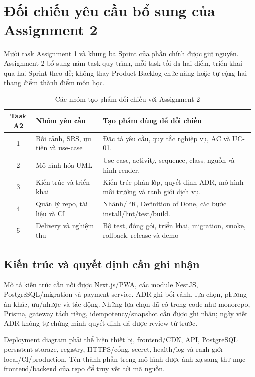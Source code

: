 \section{Đối chiếu yêu cầu bổ sung của Assignment 2}
Mười task Assignment 1 và khung ba Sprint của phần chính được giữ nguyên. Assignment 2 bổ sung năm task quy trình, mỗi task tối đa hai điểm, triển khai qua hai Sprint theo đề; không thay Product Backlog chức năng hoặc tự cộng hai thang điểm thành điểm môn học.

\begin{table}[htbp]\centering\small
\begin{tabularx}{\textwidth}{|c|X|X|}\hline
\textbf{Task A2} & \textbf{Nhóm yêu cầu} & \textbf{Tạo phẩm dùng để đối chiếu}\\\hline
1 & Bối cảnh, SRS, ưu tiên và use-case & Đặc tả yêu cầu, quy tắc nghiệp vụ, AC và UC-01.\\\hline
2 & Mô hình hóa UML & Use-case, activity, sequence, class; nguồn và hình render.\\\hline
3 & Kiến trúc và triển khai & Kiến trúc phân lớp, quyết định ADR, mô hình môi trường và ranh giới dịch vụ.\\\hline
4 & Quản lý repo, tài liệu và CI & Nhánh/PR, Definition of Done, các bước install/lint/test/build.\\\hline
5 & Delivery và nghiệm thu & Bộ test, đóng gói, triển khai, migration, smoke, rollback, release và demo.\\\hline
\end{tabularx}\caption{Các nhóm tạo phẩm đối chiếu với Assignment 2}
\end{table}

\subsection{Kiến trúc và quyết định cần ghi nhận}
Mô tả kiến trúc cần nối được Next.js/PWA, các module NestJS, PostgreSQL/migration và payment service. ADR ghi bối cảnh, lựa chọn, phương án khác, ưu/nhược và tác động. Những lựa chọn đã có trong code như monorepo, Prisma, gateway tách riêng, idempotency/snapshot cần được ghi nhận; ngày viết ADR không tự chứng minh quyết định đã được review từ trước.

Deployment diagram phải thể hiện thiết bị, frontend/CDN, API, PostgreSQL persistent storage, registry, HTTPS/cổng, secret, health/log và ranh giới local/CI/production. Tên thành phần trong mô hình được ánh xạ sang thư mục frontend/backend của repo để truy vết tới mã nguồn.


